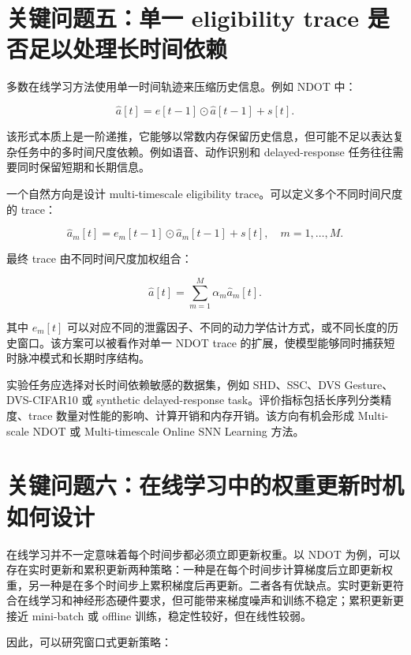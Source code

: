 \documentclass[11pt]{ctexart}
\begin{document}
\section{关键问题五：单一 eligibility trace 是否足以处理长时间依赖}

多数在线学习方法使用单一时间轨迹来压缩历史信息。例如 NDOT 中：

\begin{equation}
\hat a[t]
=
e[t-1]\odot \hat a[t-1]+s[t].
\end{equation}

该形式本质上是一阶递推，它能够以常数内存保留历史信息，但可能不足以表达复杂任务中的多时间尺度依赖。例如语音、动作识别和 delayed-response 任务往往需要同时保留短期和长期信息。

一个自然方向是设计 multi-timescale eligibility trace。可以定义多个不同时间尺度的 trace：

\begin{equation}
\hat a_m[t]
=
e_m[t-1]\odot \hat a_m[t-1]+s[t],
\quad m=1,\dots,M.
\end{equation}

最终 trace 由不同时间尺度加权组合：

\begin{equation}
\hat a[t]
=
\sum_{m=1}^{M}\alpha_m\hat a_m[t].
\end{equation}

其中 $e_m[t]$ 可以对应不同的泄露因子、不同的动力学估计方式，或不同长度的历史窗口。该方案可以被看作对单一 NDOT trace 的扩展，使模型能够同时捕获短时脉冲模式和长期时序结构。

实验任务应选择对长时间依赖敏感的数据集，例如 SHD、SSC、DVS Gesture、DVS-CIFAR10 或 synthetic delayed-response task。评价指标包括长序列分类精度、trace 数量对性能的影响、计算开销和内存开销。该方向有机会形成 Multi-scale NDOT 或 Multi-timescale Online SNN Learning 方法。

\section{关键问题六：在线学习中的权重更新时机如何设计}

在线学习并不一定意味着每个时间步都必须立即更新权重。以 NDOT 为例，可以存在实时更新和累积更新两种策略：一种是在每个时间步计算梯度后立即更新权重，另一种是在多个时间步上累积梯度后再更新。二者各有优缺点。实时更新更符合在线学习和神经形态硬件要求，但可能带来梯度噪声和训练不稳定；累积更新更接近 mini-batch 或 offline 训练，稳定性较好，但在线性较弱。

因此，可以研究窗口式更新策略：
\end{document}
